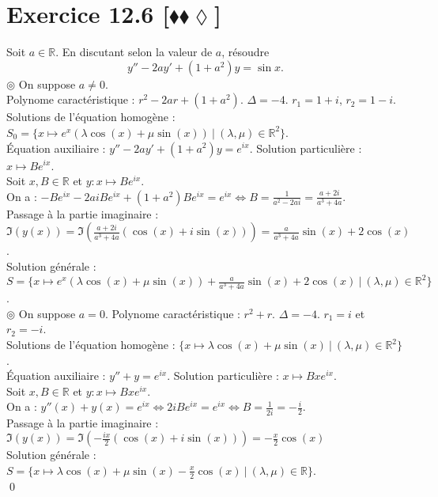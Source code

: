\documentclass[10pt]{article}
\begin{document}
\section*{Exercice 12.6 [$\blacklozenge\blacklozenge\lozenge$]}
\begin{tcolorbox}[enhanced, width=7.5in, center, size=fbox, fontupper=\large, drop shadow southwest]
    Soit $a\in\mathbb{R}$. En discutant selon la valeur de $a$, résoudre
    \begin{equation*}
        y'' - 2ay' + (1+a^2)y = \sin x.
    \end{equation*}
    $\circledcirc$ On suppose $a\neq0$.\\
    Polynome caractéristique : $r^2 - 2ar + (1 + a^2)$. $\Delta = -4$. $r_1 = 1 + i$, $r_2 = 1 - i$.\\
    Solutions de l'équation homogène : $S_0 = \{x\mapsto e^{x}\left( \lambda \cos(x) + \mu \sin(x) \right) ~ | ~ (\lambda, \mu)\in\mathbb{R}^2\}$.\\
    Équation auxiliaire : $y'' - 2ay' + (1+a^2)y = e^{ix}$. Solution particulière : $x\mapsto Be^{ix}$.\\
    Soit $x,B \in \mathbb{R}$ et $y:x\mapsto Be^{ix}$.\\
    On a : $-Be^{ix} - 2aiBe^{ix} + (1 + a^2)Be^{ix} = e^{ix} \iff B = \frac{1}{a^2-2ai} = \frac{a+2i}{a^3+4a}$.\\
    Passage à la partie imaginaire : $\Im(y(x))=\Im\left( \frac{a+2i}{a^3+4a}(\cos(x)+i\sin(x)) \right)=\frac{a}{a^3+4a}\sin(x) + 2\cos(x)$.\\
    Solution générale : $S=\{x\mapsto e^x(\lambda\cos(x) + \mu\sin(x)) + \frac{a}{a^3+4a}\sin(x) + 2\cos(x) ~ | ~ (\lambda, \mu)\in\mathbb{R}^2\}$.\\[0.2cm]
    $\circledcirc$ On suppose $a=0$.
    Polynome caractéristique : $r^2 + r$. $\Delta = -4$. $r_1 = i$ et $r_2 = -i$.\\
    Solutions de l'équation homogène : $\{x\mapsto \lambda\cos(x) + \mu\sin(x) ~ | ~ (\lambda, \mu)\in\mathbb{R}^2\}$.\\
    Équation auxiliaire : $y'' + y = e^{ix}$. Solution particulière : $x\mapsto Bxe^{ix}$.\\
    Soit $x,B\in\mathbb{R}$ et $y:x\mapsto Bxe^{ix}$.\\
    On a : $y''(x) + y(x) = e^{ix} \iff 2iBe^{ix} = e^{ix} \iff B = \frac{1}{2i} = -\frac{i}{2}$.\\
    Passage à la partie imaginaire : $\Im(y(x)) = \Im(-\frac{ix}{2}(\cos(x)+i\sin(x)))=-\frac{x}{2}\cos(x)$\\
    Solution générale : $S=\{x\mapsto \lambda\cos(x) + \mu\sin(x) - \frac{x}{2}\cos(x) ~ | ~ (\lambda, \mu)\in\mathbb{R}\}$.\\
    \qed
\end{tcolorbox}
\end{document}
